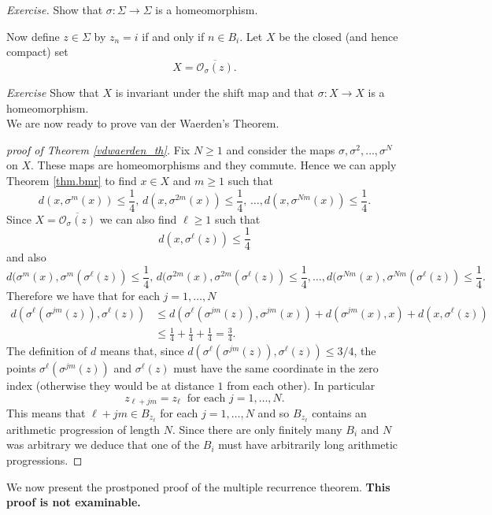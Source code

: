 \documentclass[12pt]{article}
\theoremstyle{definition}
\theoremstyle{remark}
\begin{document}
\medskip
\noindent
{\it Exercise.}
Show that $\sigma : \Sigma \to \Sigma$ is a homeomorphism.

\medskip

Now define $z \in \Sigma$ by $z_n = i$ if and only if $n \in B_i$.
Let $X$ be the closed (and hence compact) set 
\[
X = \overline{\mathcal O_\sigma(z)}.
\]

\medskip
\noindent
{\it Exercise}
Show that $X$ is invariant under the shift map and that $\sigma : X \to X$ is a homeomorphism.\\

We are now ready to prove van der Waerden's Theorem.

\begin{proof}[proof of Theorem \ref{vdwaerden_th}]
Fix $N \ge 1$ and consider the maps $\sigma, \sigma^2, \ldots, \sigma^N$ on $X$. These maps are homeomorphisms and they commute. Hence we can apply Theorem \ref{thm.bmr} to find $x \in X$ and $m \ge 1$ such that
\[
d(x,\sigma^m(x)) \le \frac{1}{4}, \, d(x,\sigma^{2m}(x)) \le \frac{1}{4}, \, \ldots, d(x, \sigma^{Nm}(x)) \le \frac{1}{4}.
\]
Since $X = \overline{\mathcal O_\sigma(z)}$ we can also find $\ell \ge 1$ such that
\[
d(x,\sigma^\ell(z)) \le \frac{1}{4} 
\]
and also
\[
d(\sigma^m(x), \sigma^m(\sigma^\ell(z)) \le \frac{1}{4}, \, d(\sigma^{2m}(x), \sigma^{2m}(\sigma^\ell(z)) \le \frac{1}{4}, \dots, d(\sigma^{Nm}(x), \sigma^{Nm}( \sigma^\ell(z)) \le \frac{1}{4}.
\]
Therefore we have that for each $j =1, \ldots, N$
\begin{align*}
d(\sigma^\ell(\sigma^{jm}(z)), \sigma^\ell(z)) &\le d(\sigma^\ell(\sigma^{jm}(z)), \sigma^{jm}(x)) + d(\sigma^{jm}(x), x) + d(x, \sigma^\ell(z))  \\
&\le \frac{1}{4} + \frac{1}{4} + \frac{1}{4} = \frac{3}{4}.
\end{align*}
The definition of $d$ means that, since $d(\sigma^\ell(\sigma^{jm}(z)), \sigma^\ell(z)) \le 3/4$, the points $\sigma^\ell(\sigma^{jm}(z))$ and $\sigma^\ell(z)$ must have the same coordinate in the zero index (otherwise they would be at distance $1$ from each other). In particular
\[
z_{\ell + jm} = z_\ell \ \text{ for each $j =1, \ldots, N$.}
\]
This means that $\ell + jm \in B_{z_\ell}$ for each $j=1, \ldots, N$ and so $B_{z_\ell}$ contains an arithmetic progression of length $N$. Since there are only finitely many $B_i$ and $N$ was arbitrary we deduce that one of the $B_i$ must have arbitrarily long arithmetic progressions.
\end{proof}

We now present the prostponed proof of the multiple recurrence theorem.
\textbf{This proof is not examinable.}
\end{document}
